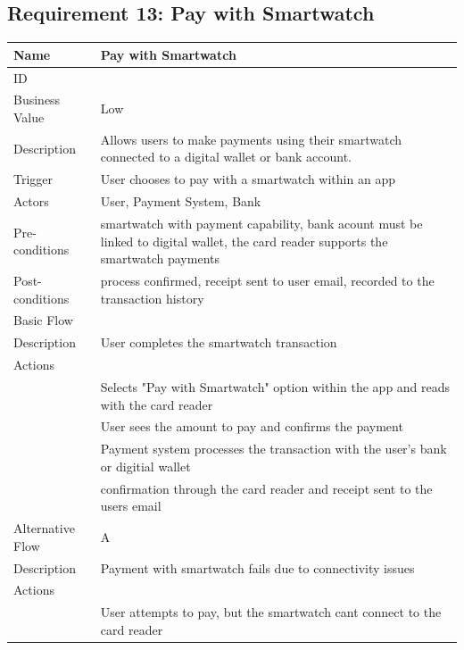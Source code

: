 \documentclass{article}
\begin{document}
\subsection{Requirement 13: Pay with Smartwatch}
	\begin{center}
		\begin{tabularx}{1.0\textwidth}{|>{\raggedright\arraybackslash}p{}|>{\raggedright\arraybackslash}X|}
			\hline
			Name             & Pay with Smartwatch \\ \hline
			ID               & 13 \\ \hline
			Business Value   & Low \\ \hline
			Description      & Allows users to make payments using their smartwatch connected to a digital wallet or bank account. \\ \hline
			Trigger          & User chooses to pay with a smartwatch within an app  \\ \hline
			Actors           & User, Payment System, Bank \\ \hline
			Pre-conditions   & smartwatch with payment capability, bank acount must be linked to digital wallet, the card reader supports the smartwatch payments \\ \hline
			Post-conditions  & process confirmed, receipt sent to user email, recorded to the transaction history \\ \hline
			Basic Flow       & \\ \hline
							Description & User completes the smartwatch transaction \\ \hline
							Actions & \\ \hline
							1 & Selects "Pay with Smartwatch" option within the app and reads with the card reader \\ \hline
							2 & User sees the amount to pay and confirms the payment  \\ \hline
							3 & Payment system processes the transaction with the user's bank or digitial wallet \\ \hline
							4 & confirmation through the card reader and receipt sent to the users email \\ \hline
			Alternative Flow & A \\ \hline
							Description & Payment with smartwatch fails due to connectivity issues \\ \hline
							Actions & \\ \hline
							1 & User attempts to pay, but the smartwatch cant connect to the card reader \\ \hline

\end{tabularx}
\end{center}
\end{document}
